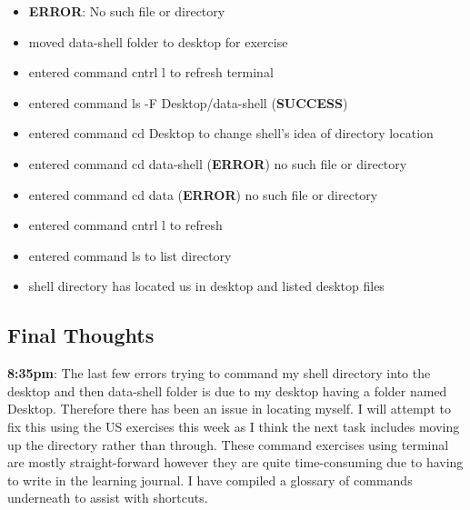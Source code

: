 \documentclass{article}
\begin{document}
\begin{itemize}
\item \textbf{ERROR}: No such file or directory
\item moved data-shell folder to desktop for exercise
\item entered command cntrl l to refresh terminal
\item entered command ls -F Desktop/data-shell (\textbf{SUCCESS})
\item entered command cd Desktop to change shell's idea of directory location
\item entered command cd data-shell (\textbf{ERROR}) no such file or directory
\item entered command cd data (\textbf{ERROR}) no such file or directory
\item entered command cntrl l to refresh
\item entered command ls to list directory 
\item shell directory has located us in desktop and listed desktop files

\end{itemize}
\subsection{Final Thoughts}
\textbf{8:35pm}: The last few errors trying to command my shell directory into the desktop and then data-shell folder is due to my desktop having a folder named Desktop. Therefore there has been an issue in locating myself. I will attempt to fix this using the US exercises this week as I think the next task includes moving up the directory rather than through. These command exercises using terminal are mostly straight-forward however they are quite time-consuming due to having to write in the learning journal. I have compiled a glossary of commands underneath to assist with shortcuts.
\end{document}
